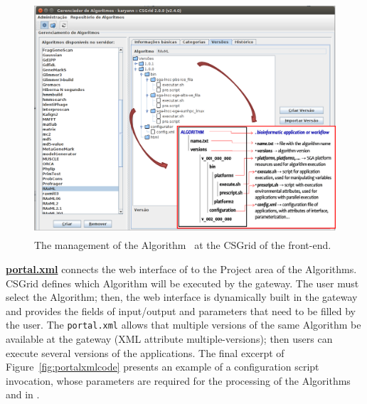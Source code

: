 \begin{figure}[!t]
\begin{center}
	\includegraphics[height=8.7cm]{imgs/raxmlmanagement.png}
	\vspace{-7px}
\caption{The management of the Algorithm ~\raxml at the CSGrid of the \system front-end.} \label{fig:raxmlmanagement}
\end{center}
\end{figure}

\underline{\textbf{portal.xml}} connects the web interface of \system to the Project area of the Algorithms. CSGrid defines which Algorithm will be executed by the gateway. The user must select the Algorithm; then, the web interface is dynamically built in the gateway and provides the fields of input/output and parameters that need to be filled by the user. The \texttt{portal.xml} allows that multiple versions of the same Algorithm be available at the gateway (XML attribute multiple-versions); then users can execute several versions of the applications. The final excerpt of Figure~\ref{fig:portalxmlcode} presents an example of a configuration script invocation, whose parameters are required for the processing of the Algorithms \raxml and \sci in \system. 

